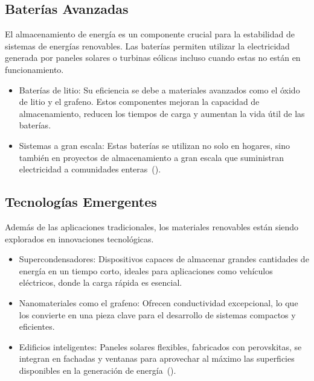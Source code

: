 \documentclass[letterpaper, 12pt]{article}
\begin{document}
\subsection*{Baterías Avanzadas}

El almacenamiento de energía es un componente crucial para la estabilidad de
sistemas de energías renovables. Las baterías permiten utilizar la electricidad
generada por paneles solares o turbinas eólicas incluso cuando estas no están
en funcionamiento.

\begin{itemize}
      \item Baterías de litio: Su eficiencia se debe a materiales avanzados como el óxido
            de litio y el grafeno. Estos componentes mejoran la capacidad de
            almacenamiento, reducen los tiempos de carga y aumentan la vida útil de las
            baterías.

      \item Sistemas a gran escala: Estas baterías se utilizan no solo en hogares, sino
            también en proyectos de almacenamiento a gran escala que suministran
            electricidad a comunidades enteras~(\cite{Galembeck2019}).
\end{itemize}

\subsection*{Tecnologías Emergentes}

Además de las aplicaciones tradicionales, los materiales renovables están
siendo explorados en innovaciones tecnológicas.

\begin{itemize}
      \item Supercondensadores: Dispositivos capaces de almacenar grandes cantidades de
            energía en un tiempo corto, ideales para aplicaciones como vehículos
            eléctricos, donde la carga rápida es esencial.

      \item Nanomateriales como el grafeno: Ofrecen conductividad excepcional, lo que los
            convierte en una pieza clave para el desarrollo de sistemas compactos y
            eficientes.

      \item Edificios inteligentes: Paneles solares flexibles, fabricados con perovskitas,
            se integran en fachadas y ventanas para aprovechar al máximo las superficies
            disponibles en la generación de energía~(\cite{Henriksson2021}).
\end{itemize}
\end{document}
